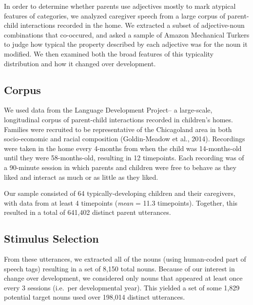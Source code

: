 \documentclass[10pt, letterpaper]{article}
\begin{document}
In order to determine whether parents use adjectives mostly to mark
atypical features of categories, we analyzed caregiver speech from a
large corpus of parent-child interactions recorded in the home. We
extracted a subset of adjective-noun combinations that co-occured, and
asked a sample of Amazon Mechanical Turkers to judge how typical the
property described by each adjective was for the noun it modified. We
then examined both the broad features of this typicality distribution
and how it changed over development.

\hypertarget{corpus}{%
\subsection{Corpus}\label{corpus}}

We used data from the Language Development Project-- a large-scale,
longitudinal corpus of parent-child interactions recorded in children's
homes. Families were recruited to be representative of the Chicagoland
area in both socio-economic and racial composition (Goldin-Meadow et
al., 2014). Recordings were taken in the home every 4-months from when
the child was 14-months-old until they were 58-months-old, resulting in
12 timepoints. Each recording was of a 90-minute session in which
parents and children were free to behave as they liked and interact as
much or as little as they liked.

Our sample consisted of 64 typically-developing children and their
caregivers, with data from at least 4 timepoints (\emph{mean} = 11.3
timepoints). Together, this resulted in a total of 641,402 distinct
parent utterances.

\hypertarget{stimulus-selection}{%
\subsection{Stimulus Selection}\label{stimulus-selection}}

From these utterances, we extracted all of the nouns (using human-coded
part of speech tags) resulting in a set of 8,150 total nouns. Because of
our interest in change over development, we considered only nouns that
appeared at least once every 3 sessions (i.e.~per developmental year).
This yielded a set of some 1,829 potential target nouns used over
198,014 distinct utterances.
\end{document}
